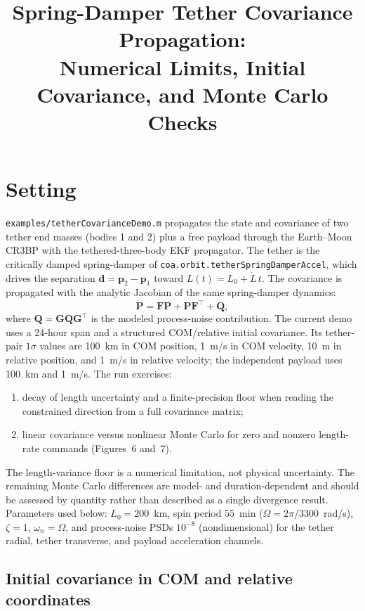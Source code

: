 \documentclass{article}
\title{Spring-Damper Tether Covariance Propagation:\\
Numerical Limits, Initial Covariance, and Monte Carlo Checks}
\author{}
\date{}
\newcommand{\Pm}{\mathbf{P}}
\newcommand{\Fm}{\mathbf{F}}
\newcommand{\Gm}{\mathbf{G}}
\newcommand{\Qm}{\mathbf{Q}}
\begin{document}
\maketitle

\section{Setting}

\texttt{examples/tetherCovarianceDemo.m} propagates the state and covariance of
two tether end masses (bodies 1 and 2) plus a free payload through the
Earth--Moon CR3BP with the tethered-three-body EKF propagator. The tether is
the critically damped spring-damper of
\texttt{coa.orbit.tetherSpringDamperAccel}, which drives the separation
$\bm{d} = \bm{p}_2 - \bm{p}_1$ toward $L(t) = L_0 + \dot L\,t$. The covariance
is propagated with the analytic Jacobian of the same spring-damper dynamics:
\begin{equation}
  \dot{\Pm} = \Fm\Pm + \Pm\Fm^{\top} + \Qm ,
  \label{eq:pdot}
\end{equation}
where $\Qm=\Gm\mathbf{Q}\Gm^\top$ is the modeled process-noise contribution.
The current demo uses a 24-hour span and a structured COM/relative initial
covariance. Its tether-pair $1\sigma$ values are 100~km in COM position,
1~m/s in COM velocity, 10~m in relative position, and 1~m/s in relative
velocity; the independent payload uses 100~km and 1~m/s. The run exercises:
\begin{enumerate}
  \item decay of length uncertainty and a finite-precision floor when reading
    the constrained direction from a full covariance matrix;
  \item linear covariance versus nonlinear Monte Carlo for zero and nonzero
    length-rate commands (Figures~6 and~7).
\end{enumerate}
The length-variance floor is a numerical limitation, not physical uncertainty.
The remaining Monte Carlo differences are model- and duration-dependent and
should be assessed by quantity rather than described as a single divergence
result. Parameters used below: $L_0=200$~km, spin period $55$~min
($\Omega=2\pi/3300$~rad/s), $\zeta=1$, $\omega_n=\Omega$, and process-noise
PSDs $10^{-8}$ (nondimensional) for the tether radial, tether transverse, and
payload acceleration channels.

\subsection{Initial covariance in COM and relative coordinates}
\end{document}

